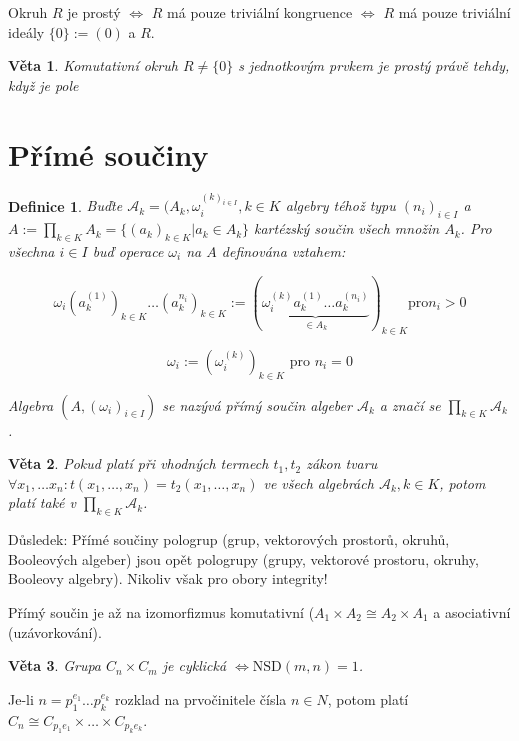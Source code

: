 \documentclass[a4paper, 11pt]{report}
\newtheorem{mydef}{Definice}[chapter]
\newtheorem{veta}{Věta}[chapter]
\begin{document}
Okruh $R$ je prostý $\Leftrightarrow$ $R$ má pouze triviální kongruence $\Leftrightarrow$ $R$ má pouze triviální ideály $\{0\} := (0)$ a $R$.

\begin{veta}
Komutativní okruh $R \not= \{0\}$ s jednotkovým prvkem je prostý právě tehdy, když je pole
\end{veta}

\section{Přímé součiny}

\begin{mydef}
Buďte $\mathcal{A}_k = (A_k, \omega_i^{(k)_{i \in I}}, k \in K$ algebry téhož typu $(n_i)_{i \in I}$ a $A := \prod\limits_{k \in K} A_k = \{(a_k)_{k \in K} | a_k \in A_k\}$ kartézský součin všech množin $A_k$. Pro všechna $i \in I$ buď operace $\omega_i$ na $A$ definována vztahem:

$$ \omega_i(a_k^{(1)})_{k \in K} \dots (a_k^{n_i})_{k \in K} := (\underbrace{\omega_i^{(k)}a_k^{(1)} \dots a_k^{(n_i)}}_{\in A_k})_{k \in K} \text{pro} n_i > 0 $$

$$ \omega_i := (\omega_i^{(k)})_{k \in K} \text{ pro } n_i = 0 $$

Algebra $(A, (\omega_i)_{i \in I})$ se nazývá přímý součin algeber $\mathcal{A}_k$ a značí se $\prod\limits_{k \in K} \mathcal{A}_k$.
\end{mydef}

\begin{veta}
Pokud platí při vhodných termech $t_1, t_2$ zákon tvaru $\forall x_1, \dots x_n : t(x_1, \dots, x_n) = t_2(x_1, \dots, x_n)$ ve všech algebrách $\mathcal{A}_k, k \in K$, potom platí také v $\prod\limits_{k \in K}\mathcal{A}_k$.
\end{veta}

Důsledek: Přímé součiny pologrup (grup, vektorových prostorů, okruhů, Booleových algeber) jsou opět pologrupy (grupy, vektorové prostoru, okruhy, Booleovy algebry). Nikoliv však pro obory integrity!

Přímý součin je až na izomorfizmus komutativní ($A_1 \times A_2 \cong A_2 \times A_1$ a asociativní (uzávorkování).

\begin{veta}
Grupa $C_n \times C_m$ je cyklická $\Leftrightarrow \text{NSD}(m, n) = 1$.
\end{veta}

Je-li $n = p_1^{e_1} \dots p_k^{e_k}$ rozklad na prvočinitele čísla $n \in N$, potom platí $C_n \cong C_{p_1{e_1}} \times \dots \times C_{p_k{e_k}}$.
\end{document}
